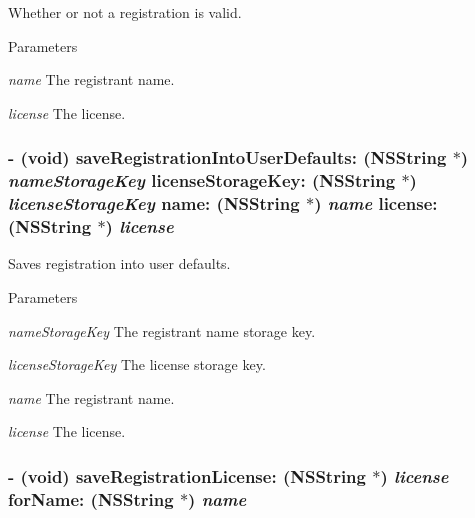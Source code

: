 Whether or not a registration is valid. 
\begin{DoxyParams}{Parameters}
\item[{\em name}]The registrant name. \item[{\em license}]The license. \end{DoxyParams}
\hypertarget{interface_g_d_registration_acc5044a15435a573919d7f6c68a70ff0}{
\subsubsection[{saveRegistrationIntoUserDefaults:licenseStorageKey:name:license:}]{\setlength{\rightskip}{0pt plus 5cm}-\/ (void) saveRegistrationIntoUserDefaults: ({\bf NSString} $\ast$) {\em nameStorageKey}\/ licenseStorageKey: ({\bf NSString} $\ast$) {\em licenseStorageKey}\/ name: ({\bf NSString} $\ast$) {\em name}\/ license: ({\bf NSString} $\ast$) {\em license}}}
\label{interface_g_d_registration_acc5044a15435a573919d7f6c68a70ff0}


Saves registration into user defaults. 
\begin{DoxyParams}{Parameters}
\item[{\em nameStorageKey}]The registrant name storage key. \item[{\em licenseStorageKey}]The license storage key. \item[{\em name}]The registrant name. \item[{\em license}]The license. \end{DoxyParams}
\hypertarget{interface_g_d_registration_a4ce808c5e052ea5080329c56b89df626}{
\subsubsection[{saveRegistrationLicense:forName:}]{\setlength{\rightskip}{0pt plus 5cm}-\/ (void) saveRegistrationLicense: ({\bf NSString} $\ast$) {\em license}\/ forName: ({\bf NSString} $\ast$) {\em name}}}
\label{interface_g_d_registration_a4ce808c5e052ea5080329c56b89df626}


